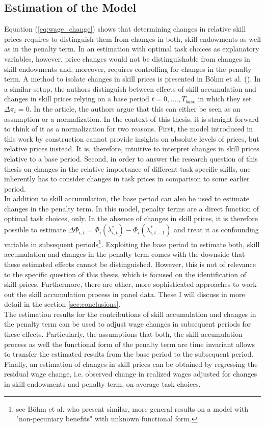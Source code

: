 \documentclass[../main.tex]{subfiles}
\begin{document}
\subsection{Estimation of the Model} \label{sec:model_estimation}
Equation (\ref{eq:wage_change}) shows that determining changes in relative skill prices requires to distinguish them from changes in both, skill endowments as well as in the penalty term. In an estimation with optimal task choices as explanatory variables, however, price changes would not be distinguishable from changes in skill endowments and, moreover, requires controlling for changes in the penalty term. A method to isolate changes in skill prices is presented in Böhm et al. (\citeyear{bohm2019occupation}). In a similar setup, the authors distinguish between effects of skill accumulation and changes in skill prices relying on a base period $t=0, ...., T_{base}$ in which they set $\Delta \pi_t = 0$. In the article, the authors argue that this can either be seen as an assumption or a normalization. In the context of this thesis, it is straight forward to think of it as a normalization for two reasons. First, the model introduced in this work by construction cannot provide insights on absolute levels of prices, but relative prices instead. It is, therefore, intuitive to interpret changes in skill prices relative to a base period. Second, in order to answer the research question of this thesis on changes in the relative importance of different task specific skills, one inherently has to consider changes in task prices in comparison to some earlier period.
\\
In addition to skill accumulation, the base period can also be used to estimate changes in the penalty term. In this model, penalty terms are a direct function of optimal task choices, only. In the absence of changes in skill prices, it is therefore possible to estimate $\Delta \Phi_{i,t} = \Phi_i(\lambda_{i,t}^*) - \Phi_i(\lambda_{i,t-1}^*)$ and treat it as confounding variable in subsequent periods\footnote{see Böhm et al. \citeyear{bohm2019occupation} who present similar, more general results on a model with "non-pecuniary benefits" with unknown functional form.}. Exploiting the base period to estimate both, skill accumulation and changes in the penalty term comes with the downside that these estimated effects cannot be distinguished. However, this is not of relevance to the specific question of this thesis, which is focused on the identification of skill prices. Furthermore, there are other, more sophisticated approaches to work out the skill accumulation process in panel data. These I will discuss in more detail in the section \ref{sec:conclusions}.
\\
The estimation results for the contributions of skill accumulation and changes in the penalty term can be used to adjust wage changes in subsequent periods for these effects. Particularly, the assumptions that both, the skill accumulation process as well the functional form of the penalty term are time invariant allows to transfer the estimated results from the base period to the subsequent period. Finally, an estimation of changes in skill prices can be obtained by regressing the residual wage change, i.e. observed change in realized wages adjusted for changes in skill endowments and penalty term, on average task choices.
\end{document}
